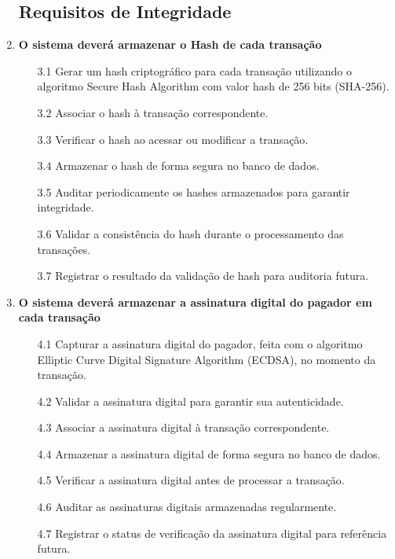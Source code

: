 \begin{enumerate}
        \subsection{Requisitos de Integridade}
    
        \item \textbf{O sistema deverá armazenar o Hash de cada transação}
        \begin{enumerate}
            \item[3.1] Gerar um hash criptográfico para cada transação utilizando o algoritmo Secure Hash Algorithm com valor hash de 256 bits (SHA-256).
            \item[3.2] Associar o hash à transação correspondente.
            \item[3.3] Verificar o hash ao acessar ou modificar a transação.
            \item[3.4] Armazenar o hash de forma segura no banco de dados.
            \item[3.5] Auditar periodicamente os hashes armazenados para garantir integridade.
            \item[3.6] Validar a consistência do hash durante o processamento das transações.
            \item[3.7] Registrar o resultado da validação de hash para auditoria futura.
        \end{enumerate}
    
        \item \textbf{O sistema deverá armazenar a assinatura digital do pagador em cada transação}
        \begin{enumerate}
            \item[4.1] Capturar a assinatura digital do pagador, feita com o algoritmo Elliptic Curve Digital Signature Algorithm (ECDSA), no momento da transação.
            \item[4.2] Validar a assinatura digital para garantir sua autenticidade.
            \item[4.3] Associar a assinatura digital à transação correspondente.
            \item[4.4] Armazenar a assinatura digital de forma segura no banco de dados.
            \item[4.5] Verificar a assinatura digital antes de processar a transação.
            \item[4.6] Auditar as assinaturas digitais armazenadas regularmente.
            \item[4.7] Registrar o status de verificação da assinatura digital para referência futura.
        \end{enumerate}
    

\end{enumerate}
